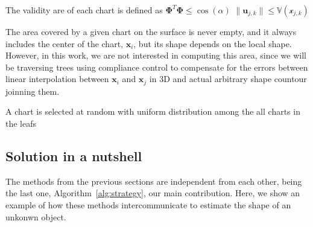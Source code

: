 The validity are of each chart is defined as
$\boldsymbol{\Phi}^{T}\boldsymbol{\Phi} \leq \cos(\alpha)$
$\| \mathbf{u}_{j,k} \| \leq \mathbb{V}(\mathcal{x}_{j,k})$

The area covered by a given chart on the surface is never empty, and
it always includes the center of the chart, $\mathbf{x}_{i}$, but its shape depends on the local shape. However, in this work, we are not interested in computing this area, since we will be traversing trees using compliance control to compensate for the errors between linear interpolation between $\mathbf{x}_i$ and $\mathbf{x}_j$ in 3D and actual arbitrary shape countour joinning them.

 A chart is selected at random with uniform distribution
among the all charts in the leafs

\subsection{Solution in a nutshell}
\label{sec:summary}

The methods from the previous sections are independent from each other, being the last one, Algorithm~\ref{alg:strategy}, our main contribution. Here, we show an example of how these methods intercommunicate to estimate the shape of an unkonwn object.

